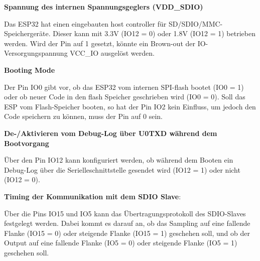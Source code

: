 \newpage

\textbf{Spannung des internen Spannungsgeglers (VDD\_SDIO)}

Das ESP32 hat einen eingebauten host controller für SD/SDIO/MMC-Speichergeräte. Dieser kann mit 3.3V (IO12 = 0) oder 1.8V (IO12 = 1) betrieben werden. Wird der Pin auf 1 gesetzt, könnte ein Brown-out der IO-Versorgungspannung VCC\_IO ausgelöst werden.

\textbf{Booting Mode}

Der Pin IO0 gibt vor, ob das ESP32 vom internen SPI-flash bootet (IO0 = 1) oder ob neuer Code in den flash Speicher geschrieben wird (IO0 = 0). Soll das ESP vom Flash-Speicher booten, so hat der Pin IO2 kein Einfluss, um jedoch den Code speichern zu können, muss der Pin auf 0 sein.

\textbf{De-/Aktivieren vom Debug-Log über U0TXD während dem Bootvorgang}

Über den Pin IO12 kann konfiguriert werden, ob während dem Booten ein Debug-Log über die Serielleschnittstelle gesendet wird (IO12 = 1) oder nicht (IO12 = 0).

\textbf{Timing der Kommunikation mit dem SDIO Slave}:

Über die Pins IO15 und IO5 kann das Übertragungsprotokoll des SDIO-Slaves festgelegt werden. Dabei kommt es darauf an, ob das Sampling auf eine fallende Flanke (IO15 = 0) oder steigende Flanke (IO15 = 1) geschehen soll, und ob der Output auf eine fallende Flanke (IO5 = 0) oder steigende Flanke (IO5 = 1) geschehen soll.

